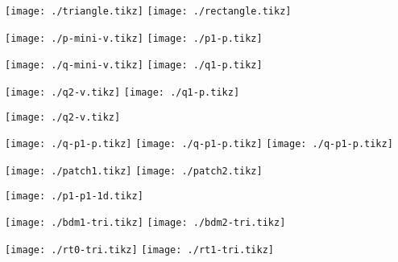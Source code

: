 \documentclass{article}
\begin{document}
\texttt{[image: ./triangle.tikz]}
\texttt{[image: ./rectangle.tikz]}

\texttt{[image: ./p-mini-v.tikz]}
\texttt{[image: ./p1-p.tikz]}

\texttt{[image: ./q-mini-v.tikz]}
\texttt{[image: ./q1-p.tikz]}

\texttt{[image: ./q2-v.tikz]}
\texttt{[image: ./q1-p.tikz]}

\texttt{[image: ./q2-v.tikz]}

\texttt{[image: ./q-p1-p.tikz]}
\texttt{[image: ./q-p1-p.tikz]}
\texttt{[image: ./q-p1-p.tikz]}


\texttt{[image: ./patch1.tikz]}
\texttt{[image: ./patch2.tikz]}

\texttt{[image: ./p1-p1-1d.tikz]}

\texttt{[image: ./bdm1-tri.tikz]}
\texttt{[image: ./bdm2-tri.tikz]}

\texttt{[image: ./rt0-tri.tikz]}
\texttt{[image: ./rt1-tri.tikz]}
\end{document}
